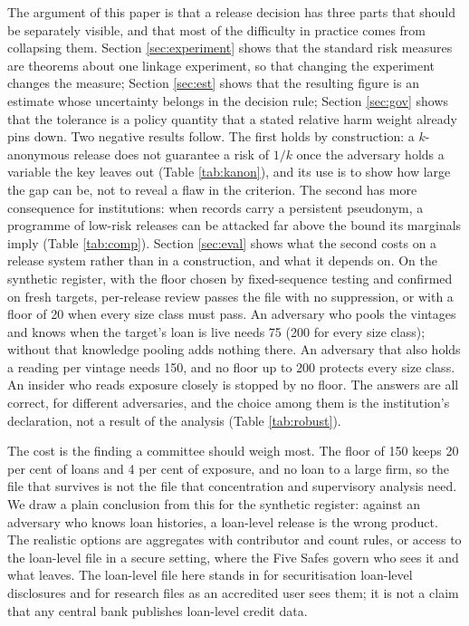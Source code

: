 \documentclass[11pt,a4paper]{article}
\theoremstyle{plain}
\theoremstyle{definition}
\theoremstyle{definition}
\theoremstyle{plain}
\begin{document}
The argument of this paper is that a release decision has three parts that
should be separately visible, and that most of the difficulty in practice comes
from collapsing them. Section \ref{sec:experiment} shows that the standard risk
measures are theorems about one linkage experiment, so that changing the
experiment changes the measure; Section \ref{sec:est} shows that the resulting
figure is an estimate whose uncertainty belongs in the decision rule; Section
\ref{sec:gov} shows that the tolerance is a policy quantity that a stated relative harm weight
already pins down. Two negative results follow. The first holds by
construction: a $k$-anonymous release does not guarantee a risk of $1/k$ once the
adversary holds a variable the key leaves out (Table \ref{tab:kanon}), and its use
is to show how large the gap can be, not to reveal a flaw in the criterion. The
second has more consequence for institutions: when records carry a persistent
pseudonym, a programme of low-risk releases can be attacked far above the bound
its marginals imply (Table \ref{tab:comp}). Section \ref{sec:eval} shows what the
second costs on a release system rather than in a construction, and what it
depends on. On the synthetic register, with the floor chosen by fixed-sequence
testing and confirmed on fresh targets, per-release review passes the file with
no suppression, or with a floor of 20 when every size class must pass. An
adversary who pools the vintages and knows when the target's loan is live needs
75 (200 for every size class); without that knowledge pooling adds nothing there.
An adversary that also holds a reading per vintage needs 150, and no floor up to
200 protects every size class. An insider who reads exposure closely is stopped
by no floor. The answers are all correct, for different adversaries, and the
choice among them is the institution's declaration, not a result of the analysis
(Table \ref{tab:robust}).

The cost is the finding a committee should weigh most. The floor of 150 keeps 20
per cent of loans and 4 per cent of exposure, and no loan to a large firm, so the
file that survives is not the file that concentration and supervisory analysis
need. We draw a plain conclusion from this for the synthetic register: against an
adversary who knows loan histories, a loan-level release is the wrong product.
The realistic options are aggregates with contributor and count rules, or access
to the loan-level file in a secure setting, where the Five Safes govern who sees
it and what leaves. The loan-level file here stands in for securitisation
loan-level disclosures and for research files as an accredited user sees them;
it is not a claim that any central bank publishes loan-level credit data.
\end{document}
